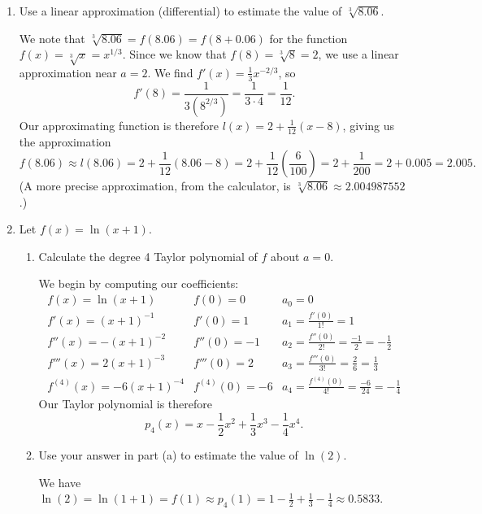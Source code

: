 \documentclass[12pt]{article}
\begin{document}
\begin{enumerate}
\bigskip

 \item Use a linear approximation (differential) to estimate the value of $\sqrt[3]{8.06}$.

\medskip

 We note that $\sqrt[3]{8.06} = f(8.06) = f(8+0.06)$ for the function $f(x)=\sqrt[3]{x} = x^{1/3}$. Since we know that $f(8) = \sqrt[3]{8}=2$, we use a linear approximation near $a=2$. We find $f'(x) = \frac{1}{3}x^{-2/3}$, so
\[
 f'(8) = \frac{1}{3(8^{2/3})} = \frac{1}{3\cdot 4} = \frac{1}{12}.
\]
Our approximating function is therefore $l(x) = 2+\frac{1}{12}(x-8)$, giving us the approximation
\[
 f(8.06) \approx l(8.06) = 2+\frac{1}{12}(8.06-8) = 2+\frac{1}{12}\left(\frac{6}{100}\right) = 2+\frac{1}{200} = 2+0.005 = 2.005.
\]
(A more precise approximation, from the calculator, is $\sqrt[3]{8.06}\approx 2.004987552$.)

\newpage

 \item Let $f(x) = \ln(x+1)$.
\begin{enumerate}
 \item Calculate the degree 4 Taylor polynomial of $f$ about $a=0$.

\medskip

We begin by computing our coefficients:
\[
\begin{array}{lll}
 f(x) = \ln(x+1) & f(0) = 0 & a_0=0\\
 f'(x) = (x+1)^{-1} & f'(0) = 1 & a_1 = \frac{f'(0)}{1!} = 1\\
 f''(x) = -(x+1)^{-2} & f''(0) = -1 & a_2 = \frac{f''(0)}{2!} = \frac{-1}{2}=-\frac{1}{2}\\
 f'''(x) = 2(x+1)^{-3} & f'''(0) = 2 & a_3 = \frac{f'''(0)}{3!} = \frac{2}{6} = \frac{1}{3}\\
 f^{(4)}(x) = -6(x+1)^{-4} & f^{(4)}(0) = -6 & a_4 = \frac{f^{(4)}(0)}{4!} = \frac{-6}{24} = -\frac{1}{4}
\end{array}
\]
Our Taylor polynomial is therefore 
\[
p_4(x) = x-\frac{1}{2} x^2+\frac{1}{3}x^3-\frac{1}{4}x^4.
\]

\medskip

 \item Use your answer in part (a) to estimate the value of $\ln(2)$.

\medskip

We have $\ln(2) = \ln(1+1) = f(1) \approx p_4(1) = 1-\frac{1}{2}+\frac{1}{3}-\frac{1}{4} \approx 0.5833$.

\medskip



\end{enumerate}
\end{enumerate}
\end{document}
